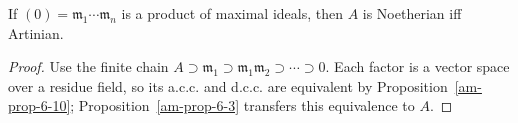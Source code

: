 \begin{corollary}
\label{am-cor-6-11}
\uses{}
If $(0)=\mathfrak{m}_1\cdots\mathfrak{m}_n$ is a product of maximal ideals, then $A$ is Noetherian
iff Artinian.
\end{corollary}
\begin{proof}
Use the finite chain $A\supset\mathfrak{m}_1\supset\mathfrak{m}_1\mathfrak{m}_2\supset\cdots\supset0$.
Each factor is a vector space over a residue field, so its a.c.c. and d.c.c.
are equivalent by Proposition~\ref{am-prop-6-10}; Proposition~\ref{am-prop-6-3}
transfers this equivalence to $A$.
\end{proof}
